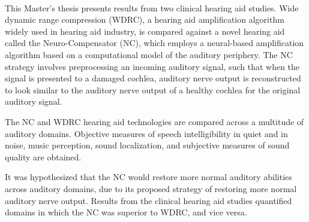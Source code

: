 \paragraph{}This Master's thesis presents results from two clinical hearing aid studies.  Wide dynamic range compression (WDRC), a hearing aid amplification algorithm widely used in hearing aid industry, is compared against a novel hearing aid called the Neuro-Compensator (NC), which employs a neural-based amplification algorithm based on a computational model of the auditory periphery.  The NC strategy involves preprocessing an incoming auditory signal, such that when the signal is presented to a damaged cochlea, auditory nerve output is reconstructed to look similar to the auditory nerve output of a healthy cochlea for the original auditory signal.

The NC and WDRC hearing aid technologies are compared across a multitude of auditory domains.  Objective measures of speech intelligibility in quiet and in noise, music perception, sound localization, and subjective measures of sound quality are obtained.

It was hypothesized that the NC would restore more normal auditory abilities across auditory domains, due to its proposed strategy of restoring more normal auditory nerve output.  Results from the clinical hearing aid studies quantified domains in which the NC was superior to WDRC, and vice versa. 